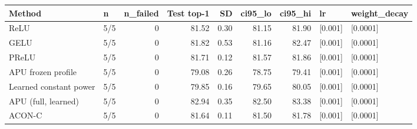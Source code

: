 \begin{tabular}{llrrrrrll}
\toprule
Method & n & n\_failed & Test top-1 & SD & ci95\_lo & ci95\_hi & lr & weight\_decay \\
\midrule
ReLU & 5/5 & 0 & 81.52 & 0.30 & 81.15 & 81.90 & [0.001] & [0.0001] \\
GELU & 5/5 & 0 & 81.82 & 0.53 & 81.16 & 82.47 & [0.001] & [0.0001] \\
PReLU & 5/5 & 0 & 81.71 & 0.12 & 81.57 & 81.86 & [0.001] & [0.0001] \\
APU frozen profile & 5/5 & 0 & 79.08 & 0.26 & 78.75 & 79.41 & [0.001] & [0.0001] \\
Learned constant power & 5/5 & 0 & 79.85 & 0.16 & 79.65 & 80.05 & [0.001] & [0.0001] \\
APU (full, learned) & 5/5 & 0 & 82.94 & 0.35 & 82.50 & 83.38 & [0.001] & [0.0001] \\
ACON-C & 5/5 & 0 & 81.64 & 0.11 & 81.50 & 81.78 & [0.001] & [0.0001] \\
\bottomrule
\end{tabular}
